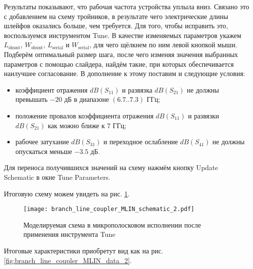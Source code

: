 Результаты показывают, что рабочая частота устройства уплыла вниз. Связано это с добавлением на схему тройников, в результате чего электрические длины шлейфов оказались больше, чем требуется.
Для того, чтобы исправить это, воспользуемся инструментом Tune.
В качестве изменяемых параметров укажем $L_\text{shunt}$, $W_\text{shunt}$, $L_\text{serial}$ и $W_\text{serial}$, для чего щёлкнем по ним левой кнопкой мыши.
Подберём оптимальный размер шага, после чего изменяя значения выбранных параметров с помощью слайдера, найдём такие, при которых обеспечивается наилучшее согласование.
В дополнение к этому поставим и следующие условия:
\begin{itemize}
    \item коэффициент отражения $dB(S_{11})$ и развязка $dB(S_{21})$ не должны превышать $-20 \text{~дБ}$ в диапазоне $(6.7 .. 7.3) \text{~ГГц}$;
    \item положение провалов коэффициента отражения $dB(S_{11})$ и развязки $dB(S_{21})$ как можно ближе к $7 \text{~ГГц}$;
    \item рабочее затухание $dB(S_{31})$ и переходное ослабление $dB(S_{41})$ не должны опускаться меньше $-3.5 \text{~дБ}$.
\end{itemize}
Для переноса получившихся значений на схему нажмём кнопку Update Schematic в окне Tune Parameters.

Итоговую схему можем увидеть на рис. \ref{fig:branch_line_coupler_MLIN_schematic_2}.

\begin{figure}
    \centering
    \texttt{[image: branch\_line\_coupler\_MLIN\_schematic\_2.pdf]}
    \caption{Моделируемая схема в микрополосковом исполнении после применения инструмента Tune}
    \label{fig:branch_line_coupler_MLIN_schematic_2}
\end{figure}

Итоговые характеристики приобретут вид как на рис. \ref{fig:branch_line_coupler_MLIN_data_2}.

